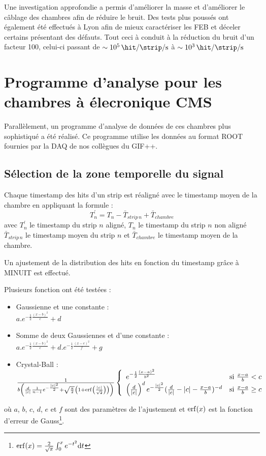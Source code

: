 Une investigation approfondie a permis d'améliorer la masse et d'améliorer le câblage des chambres afin de réduire le bruit. Des tests plus poussés ont également été effectués à Lyon afin de mieux caractériser les FEB et déceler certains présentant des défauts. Tout ceci à conduit à la réduction du bruit d'un facteur \num{100}, celui-ci passant de $\sim\SI{e5}{\hit\per\strip\per\second}$ à $\sim\SI{e3}{\hit\per\strip\per\second}$
\vspace*{-0.5cm}
\section{Programme d’analyse pour les chambres à élecronique CMS}
\vspace*{-0.4cm}
\label{prog}
Parallèlement, un programme d'analyse de données de ces chambres plus sophistiqué a été réalisé. Ce programme utilise les données au format ROOT fournies par la DAQ de nos collègues du GIF++.
\vspace*{-0.4cm}
\subsection{Sélection de la zone temporelle du signal}
\vspace*{-0.4cm}
Chaque timestamp des hits d'un strip est réaligné avec le timestamp moyen de la chambre en appliquant la formule :
\begin{equation}
T^{'}_{n}=T_{n}-\bar{T}_{strip\, n}+\bar{T}_{chambre}
\end{equation}
avec $T^{'}_{n}$ le timestamp du strip $n$ aligné, $T_{n}$ le timestamp du strip $n$ non aligné $\bar{T}_{strip\, n}$ le timestamp moyen du strip $n$ et $\bar{T}_{chambre}$ le timestamp moyen de la chambre. 

Un ajustement de la distribution des hits en fonction du timestamp grâce à MINUIT est effectué. 

Plusieurs fonction ont été testées :
\begin{itemize}[label=$\bullet$]
	\item Gaussienne et une constante : \\ $a.e^{-\frac{1}{2}\frac{(x-b)^2}{c}}+d$ 
	\item Somme de deux Gaussiennes et d'une constante : \\ $a.e^{-\frac{1}{2}\frac{(x-b)^2}{c}}+d.e^{-\frac{1}{2}\frac{(x-e)^2}{f}}+g$ 
	\item Crystal-Ball : \\ $\frac{1}{b\left(\frac{d}{|c|}\frac{1}{n-1}e^{-\frac{|c|^2}{2}}+\sqrt{\frac{\pi}{2}}\left(1+\erf\left(\frac{|c|}{\sqrt{2}}\right)\right) \right)}\left\{
	\begin{array}{ll}
	e^{-\frac{1}{2}\frac{(x-a)^2}{b^2}} & \mbox{si } \frac{x-a}{b}<c \\
	\left(\frac{d}{|c|}\right)^d e^{-\frac{|c|^2}{2}} (\frac{d}{|c|}-|c|-\frac{x-a}{b})^{-d} & \mbox{si }\frac{x-a}{b}\geq c
	\end{array}
	\right.$
\end{itemize}
où $a$, $b$, $c$, $d$, $e$ et $f$ sont des paramètres de l'ajustement et $\erf(x)$ est la fonction d'erreur de Gauss\footnote{$\erf(x)=\frac{2}{\sqrt{\pi}}\int_0^x e^{-t^2} \dd t$}.

